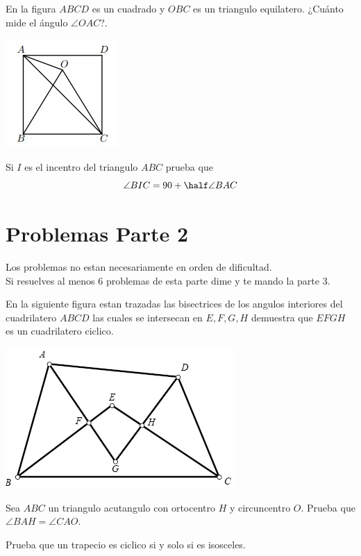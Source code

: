 \documentclass[11pt]{scrartcl}
\begin{document}
\begin{problem}
En la figura $ABCD$ es un cuadrado y $OBC$ es un triangulo equilatero. ¿Cuánto mide el ángulo $\angle OAC$?.
\begin{center}
    \includegraphics[]{I2.jpg}
\end{center}
\end{problem}

\begin{problem}
Si $I$ es el incentro del triangulo $ABC$ prueba que 
$$\angle BIC =90+\half \angle BAC$$
\end{problem}

\newpage
\section{Problemas Parte 2}
Los problemas no estan necesariamente en orden de dificultad. \\
Si resuelves al menos 6 problemas de esta parte dime y te mando la parte 3. 
\begin{problem}
    En la siguiente figura estan trazadas las bisectrices de los angulos interiores del cuadrilatero $ABCD$ las cuales se intersecan en $E,F,G,H$ demuestra que $EFGH$ es un cuadrilatero ciclico.
    \begin{center}
        \includegraphics[scale=0.7]{I3.png}
    \end{center}
\end{problem}



\begin{problem}
 Sea $ABC$ un triangulo acutangulo con ortocentro $H$ y circuncentro $O$. Prueba que $\angle BAH=\angle CAO$.
\end{problem}
\begin{problem}
    Prueba que un trapecio es ciclico si y solo si es isosceles.
\end{problem}
\end{document}
